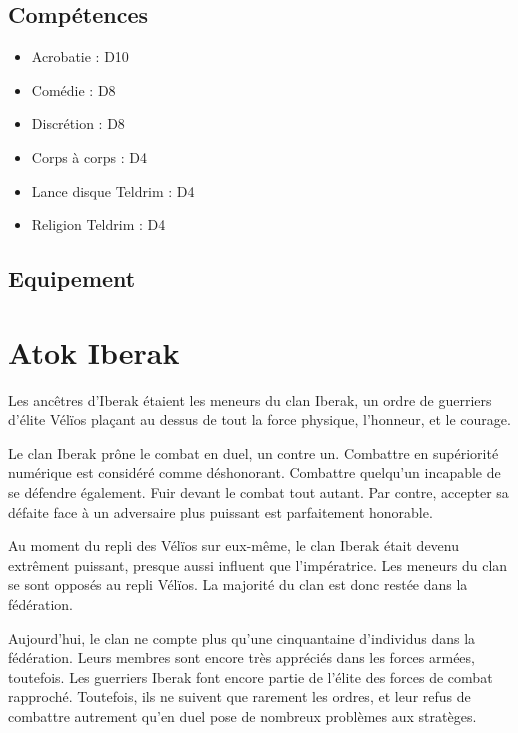 \begin{multicols}{2}
\section*{Compétences}

\begin{itemize}
\item Acrobatie : D10
\item Comédie : D8
\item Discrétion : D8
\item Corps à corps : D4
\item Lance disque Teldrim : D4
\item Religion Teldrim : D4
\end{itemize}

\section*{Equipement}

\end{multicols}

\clearpage

\chapter*{Atok Iberak}

Les ancêtres d'Iberak étaient les meneurs du clan Iberak, un ordre de guerriers d'élite Vélïos plaçant au dessus de tout la force physique, l'honneur, et le courage. 

Le clan Iberak prône le combat en duel, un contre un. Combattre en supériorité numérique est considéré comme déshonorant. Combattre quelqu'un incapable de se défendre également. Fuir devant le combat tout autant. Par contre, accepter sa défaite face à un adversaire plus puissant est parfaitement honorable.

Au moment du repli des Vélïos sur eux-même, le clan Iberak était devenu extrêment puissant, presque aussi influent que l'impératrice. Les meneurs du clan se sont opposés au repli Vélïos. La majorité du clan est donc restée dans la fédération.

Aujourd'hui, le clan ne compte plus qu'une cinquantaine d'individus dans la fédération. Leurs membres sont encore très appréciés dans les forces armées, toutefois. Les guerriers Iberak font encore partie de l'élite des forces de combat rapproché. Toutefois, ils ne suivent que rarement les ordres, et leur refus de combattre autrement qu'en duel pose de nombreux problèmes aux stratèges.


